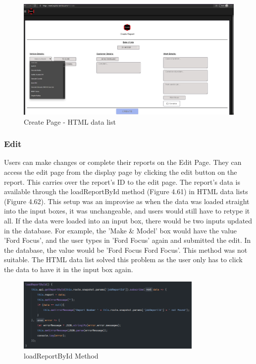 \begin{figure}[H]
    \centering
    \caption{Create Page - HTML data list}
    \label{image:HTMLdatalist}
    \includegraphics[width=1.0\textwidth]{images/repota/UI/create-data.png}
\end{figure}

\subsubsection{Edit}
Users can make changes or complete their reports on the Edit Page. They can access the edit page from the display page by clicking the edit button on the report. This carries over the report's ID to the edit page. The report's data is available through the loadReportById method (Figure 4.61) in HTML data lists (Figure 4.62). This setup was an improvise as when the data was loaded straight into the input boxes, it was unchangeable, and users would still have to retype it all. If the data were loaded into an input box, there would be two inputs updated in the database. For example, the 'Make \& Model' box would have the value 'Ford Focus', and the user types in 'Ford Focus' again and submitted the edit. In the database, the value would be 'Ford Focus Ford Focus'. This method was not suitable. The HTML data list solved this problem as the user only has to click the data to have it in the input box again.

\begin{figure}[H]
    \centering
    \caption{loadReportById Method}
    \label{image:loadReportById}
    \includegraphics[width=0.8\textwidth]{images/repota/report_pages/load_report.png}
\end{figure}

